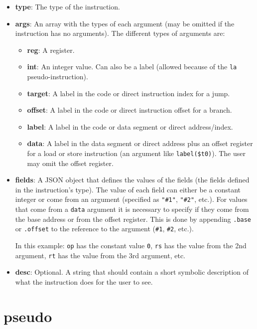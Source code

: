 \documentclass[11pt,a4paper,twoside,titlepage]{report}
\begin{document}
\begin{itemize}
	\item \textbf{type}: The type of the instruction.
	\item \textbf{args}: An array with the types of each argument (may be omitted if
		the instruction has no arguments).
		The different types of arguments are:
		\begin{itemize}
			\item \textbf{reg}: A register.
			\item \textbf{int}: An integer value. Can also be a label (allowed because 
				of the \verb+la+ pseudo-instruction).
			\item \textbf{target}: A label in the code or direct instruction index for 
				a jump.
			\item \textbf{offset}: A label in the code or direct instruction offset 
				for a branch.
			\item \textbf{label}: A label in the code or data segment or direct 
				address/index.
			\item \textbf{data}: A label in the data segment or direct address plus
				an offset register for a load or store instruction (an argument like
				\verb+label($t0)+). The user may omit the offset register.
		\end{itemize}
	\item \textbf{fields}: A JSON object that defines the values of the fields
		(the fields defined in the instruction's type). The value of each field
		can either be a constant integer or come from an argument (specified as
		\verb+"#1"+, \verb+"#2"+, etc.).
		For values that come from a \verb+data+ argument it is necessary to
		specify if they come from the base address or from the offset register.
		This is done by appending \verb+.base+ or \verb+.offset+ to the reference
		to the argument (\verb+#1+, \verb+#2+, etc.).
		
		In this example: \verb+op+ has the constant value \verb+0+, \verb+rs+
		has the value from the 2nd argument, \verb+rt+ has the value from the 3rd
		argument, etc.
	\item \textbf{desc}: Optional. A string that should contain a short symbolic
		description of what the instruction does for the user to see.
\end{itemize}


\section{pseudo}
\end{document}
